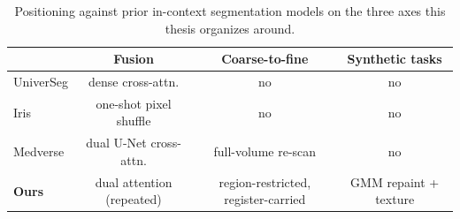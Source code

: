 \begin{table}[t]
  \centering
  \small
  \caption{Positioning against prior in-context segmentation models on
  the three axes this thesis organizes around.}\label{tab:relatedwork}
  \begin{tabular}{lccc}
    \toprule
     & Fusion & Coarse-to-fine & Synthetic tasks \\
    \midrule
    UniverSeg & dense cross-attn. & no & no \\
    Iris & one-shot pixel shuffle & no & no \\
    Medverse & dual U-Net cross-attn. & full-volume re-scan & no \\
    \textbf{Ours} & dual attention (repeated) & region-restricted, register-carried & GMM repaint + texture \\
    \bottomrule
  \end{tabular}
\end{table}
